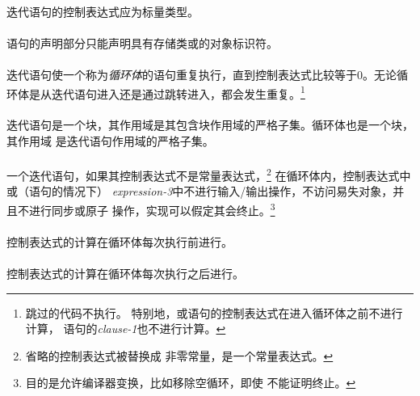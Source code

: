 \constraint
\paragraph{}
迭代语句的控制表达式应为标量类型。

\paragraph{}
语句的声明部分只能声明具有存储类或的对象标识符。

\semantic
\paragraph{}
迭代语句使一个称为\textit{循环体}的语句重复执行，直到控制表达式比较等于0。无论循
环体是从迭代语句进入还是通过跳转进入，都会发生重复。\footnote{跳过的代码不执行。
特别地，或语句的控制表达式在进入循环体之前不进行计算，
语句的\textit{clause-1}也不进行计算。}

\paragraph{}
迭代语句是一个块，其作用域是其包含块作用域的严格子集。循环体也是一个块，其作用域
是迭代语句作用域的严格子集。

\paragraph{}
一个迭代语句，如果其控制表达式不是常量表达式，\footnote{省略的控制表达式被替换成
非零常量，是一个常量表达式。} 在循环体内，控制表达式中或（语句的情况下）
\textit{expression-3}中不进行输入/输出操作，不访问易失对象，并且不进行同步或原子
操作，实现可以假定其会终止。\footnote{目的是允许编译器变换，比如移除空循环，即使
不能证明终止。}

\paragraph{}
控制表达式的计算在循环体每次执行前进行。

\paragraph{}
控制表达式的计算在循环体每次执行之后进行。

